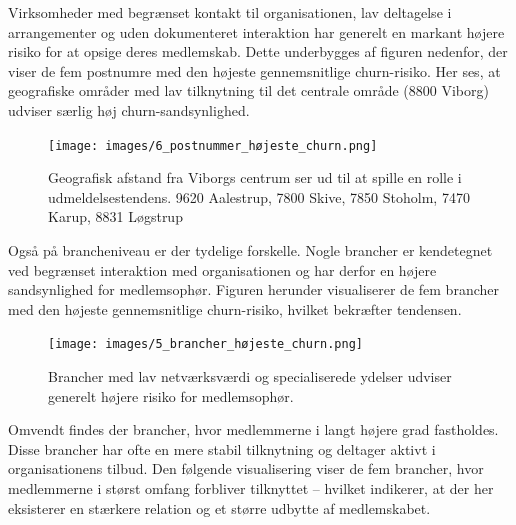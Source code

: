 \documentclass[
  11pt,
  letterpaper,
  DIV=11,
  numbers=noendperiod]{scrartcl}
\begin{document}
Virksomheder med begrænset kontakt til organisationen, lav deltagelse i
arrangementer og uden dokumenteret interaktion har generelt en markant
højere risiko for at opsige deres medlemskab. Dette underbygges af
figuren nedenfor, der viser de fem postnumre med den højeste
gennemsnitlige churn-risiko. Her ses, at geografiske områder med lav
tilknytning til det centrale område (8800 Viborg) udviser særlig høj
churn-sandsynlighed.

\begin{figure}[H]

{\centering \texttt{[image: images/6\_postnummer\_højeste\_churn.png]}

}

\caption{Geografisk afstand fra Viborgs centrum ser ud til at spille en
rolle i udmeldelsestendens. 9620 Aalestrup, 7800 Skive, 7850 Stoholm,
7470 Karup, 8831 Løgstrup}

\end{figure}%

Også på brancheniveau er der tydelige forskelle. Nogle brancher er
kendetegnet ved begrænset interaktion med organisationen og har derfor
en højere sandsynlighed for medlemsophør. Figuren herunder visualiserer
de fem brancher med den højeste gennemsnitlige churn-risiko, hvilket
bekræfter tendensen.

\begin{figure}[H]

{\centering \texttt{[image: images/5\_brancher\_højeste\_churn.png]}

}

\caption{Brancher med lav netværksværdi og specialiserede ydelser
udviser generelt højere risiko for medlemsophør.}

\end{figure}%

Omvendt findes der brancher, hvor medlemmerne i langt højere grad
fastholdes. Disse brancher har ofte en mere stabil tilknytning og
deltager aktivt i organisationens tilbud. Den følgende visualisering
viser de fem brancher, hvor medlemmerne i størst omfang forbliver
tilknyttet -- hvilket indikerer, at der her eksisterer en stærkere
relation og et større udbytte af medlemskabet.
\end{document}
